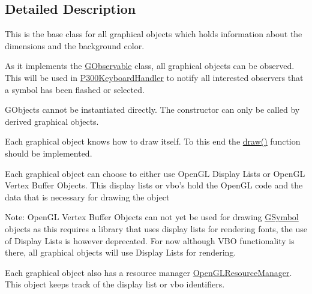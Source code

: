\subsection{Detailed Description}
This is the base class for all graphical objects which holds information about the dimensions and the background color.\par
 As it implements the \hyperlink{classOpenViBEApplications_1_1GObservable}{GObservable} class, all graphical objects can be observed. This will be used in \hyperlink{classOpenViBEApplications_1_1P300KeyboardHandler}{P300KeyboardHandler} to notify all interested observers that a symbol has been flashed or selected.\par
 GObjects cannot be instantiated directly. The constructor can only be called by derived graphical objects.\par
 Each graphical object knows how to draw itself. To this end the \hyperlink{classOpenViBEApplications_1_1GObject_a00e373a12688223086a334eae0436332}{draw()} function should be implemented.\par
 Each graphical object can choose to either use OpenGL Display Lists or OpenGL Vertex Buffer Objects. This display lists or vbo's hold the OpenGL code and the data that is necessary for drawing the object\par
 Note: OpenGL Vertex Buffer Objects can not yet be used for drawing \hyperlink{classOpenViBEApplications_1_1GSymbol}{GSymbol} objects as this requires a library that uses display lists for rendering fonts, the use of Display Lists is however deprecated. For now although VBO functionality is there, all graphical objects will use Display Lists for rendering.\par
 Each graphical object also has a resource manager \hyperlink{classOpenViBEApplications_1_1OpenGLResourceManager}{OpenGLResourceManager}. This object keeps track of the display list or vbo identifiers.\par
 

